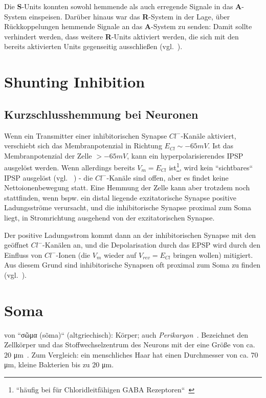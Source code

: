 Die \textbf{S}-Units konnten sowohl hemmende als auch erregende Signale in das \textbf{A}-System einspeisen.
Darüber hinaus war das \textbf{R}-System in der Lage, über Rückkoppelungen hemmende Signale an das \textbf{A}-System zu senden: Damit sollte verhindert werden, dass weitere \textbf{R}-Units aktiviert werden, die sich mit den bereits aktivierten Units gegenseitig ausschließen (vgl.~\cite[4 f.]{Ros57}).



\section{Shunting Inhibition}\label{appendix:shuntinginhibition}
\subsection*{Kurzschlusshemmung bei Neuronen}
Wenn ein Transmitter einer inhibitorischen Synapse $Cl^-$-Kanäle aktiviert, verschiebt sich das Membranpotenzial in Richtung $E_{Cl} \sim -65 mV$.
Ist das Membranpotenzial der Zelle $> -65 mV$, kann ein hyperpolarisierendes IPSP ausgelöst werden.
Wenn allerdings bereits $V_m = E_{Cl}$ ist\footnote{
    ``häufig bei für Chloridleitfähigen GABA Rezeptoren``~\cite[100]{HS19a}
}, wird kein ``sichtbares`` IPSP ausgelöst (vgl. ~\cite[145 f.]{BCP18}) - die $Cl^-$-Kanäle sind offen, aber es findet keine Nettoionenbewegung statt.
Eine Hemmung der Zelle kann aber trotzdem noch stattfinden, wenn bspw. ein distal liegende exzitatorische Synapse positive Ladungsströme verursacht, und die inhibitorische Synapse proximal zum Soma liegt, in Stromrichtung ausgehend von der exzitatorischen Synapse.

Der positive Ladungsstrom kommt dann an der inhibitorischen Synapse mit den geöffnet $Cl^-$-Kanälen an, und die Depolarisation durch das EPSP wird durch den Einfluss von $Cl^-$-Ionen (die $V_m$ wieder auf $V_{rev} = E_{Cl}$ bringen wollen) mitigiert.\\

Aus diesem Grund sind inhibitorische Synapsen oft proximal zum Soma zu finden (vgl.~\cite[231]{KSJ+13}).


\section{Soma}\label{appendix:soma}
von ``\textgreek{σῶμα} (sõma)`` (altgriechisch): Körper; auch \textit{Perikaryon}~\cite[58]{RK18}.
Bezeichnet den Zellkörper und das Stoffwechselzentrum des Neurons mit der eine Größe von ca. $20$ μm~\cite[29]{BCP18}.
Zum Vergleich: ein menschliches Haar hat einen Durchmesser von ca. $70$ μm, kleine Bakterien bis zu $20$ μm.


